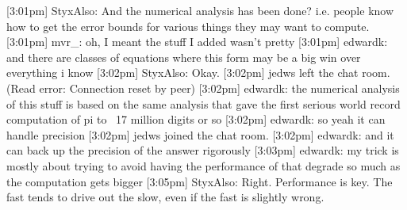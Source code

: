 \documentclass{beamer}
\begin{document}
[3:01pm] StyxAlso: And the numerical analysis has been done? i.e. people know how to get the error bounds for various things they may want to compute.
[3:01pm] mvr_: oh, I meant the stuff I added wasn't pretty
[3:01pm] edwardk: and there are classes of equations where this form may be a big win over everything i know
[3:02pm] StyxAlso: Okay.
[3:02pm] jedws left the chat room. (Read error: Connection reset by peer)
[3:02pm] edwardk: the numerical analysis of this stuff is based on the same analysis that gave the first serious world record computation of pi to ~17 million digits or so
[3:02pm] edwardk: so yeah it can handle precision
[3:02pm] jedws joined the chat room.
[3:02pm] edwardk: and it can back up the precision of the answer rigorously
[3:03pm] edwardk: my trick is mostly about trying to avoid having the performance of that degrade so much as the computation gets bigger
[3:05pm] StyxAlso: Right. Performance is key. The fast tends to drive out the slow, even if the fast is slightly wrong.
\end{document}
